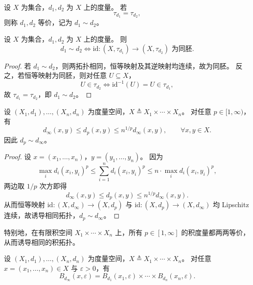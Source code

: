 \documentclass[lang=cn,a4paper,newtx,section]{elegantbook}
\begin{document}
\begin{definition}
  设 $X$ 为集合，$d_1,d_2$ 为 $X$ 上的度量。
  若
  \[
    \tau_{d_1}=\tau_{d_2},
  \]
  则称 $d_1,d_2$ 等价，记为 $d_1\sim d_2$。
\end{definition}

\begin{proposition}\label{prop:equivalent-metrics-homeomorphism}
  设 $X$ 为集合，$d_1,d_2$ 为 $X$ 上的度量。
  则
  \[
    d_1\sim d_2
    \iff
    \mathrm{id}:(X,\tau_{d_1})\to (X,\tau_{d_2})\text{ 为同胚}.
  \]
\end{proposition}

\begin{proof}
  若 $d_1\sim d_2$，则两拓扑相同，恒等映射及其逆映射均连续，故为同胚。
  反之，若恒等映射为同胚，则对任意 $U\subseteq X$，
  \[
    U\in\tau_{d_2}\iff \mathrm{id}^{-1}(U)=U\in\tau_{d_1},
  \]
  故 $\tau_{d_1}=\tau_{d_2}$，即 $d_1\sim d_2$。
\end{proof}

\begin{proposition}\label{prop:dp-dinfty-equivalent}
  设 $(X_1,d_1),\dots,(X_n,d_n)$ 为度量空间，$X\triangleq X_1\times\cdots\times X_n$。
  对任意 $p\in[1,\infty)$，有
  \[
    d_\infty(x,y)\le d_p(x,y)\le n^{1/p}d_\infty(x,y),\qquad \forall x,y\in X.
  \]
  因此 $d_p\sim d_\infty$。
\end{proposition}

\begin{proof}
  设 $x=(x_1,\dots,x_n)$，$y=(y_1,\dots,y_n)$。
  因为
  \[
    \max_i d_i(x_i,y_i)^p\le \sum_{i=1}^{n}d_i(x_i,y_i)^p\le n\cdot\max_i d_i(x_i,y_i)^p,
  \]
  两边取 $1/p$ 次方即得
  \[
    d_\infty(x,y)\le d_p(x,y)\le n^{1/p}d_\infty(x,y).
  \]
  从而恒等映射 $\mathrm{id}:(X,d_\infty)\to(X,d_p)$ 与 $\mathrm{id}:(X,d_p)\to(X,d_\infty)$ 均 Lipschitz 连续，故诱导相同拓扑，$d_p\sim d_\infty$。
\end{proof}

\begin{remark}
  特别地，在有限积空间 $X_1\times\cdots\times X_n$ 上，所有 $p\in[1,\infty]$ 的积度量都两两等价，从而诱导相同的积拓扑。
\end{remark}

\begin{proposition}\label{prop:dinfty-ball-product}
  设 $(X_1,d_1),\dots,(X_n,d_n)$ 为度量空间，$X\triangleq X_1\times\cdots\times X_n$。
  对任意 $x=(x_1,\dots,x_n)\in X$ 与 $\varepsilon>0$，有
  \[
    B_{d_\infty}(x,\varepsilon)=B_{d_1}(x_1,\varepsilon)\times\cdots\times B_{d_n}(x_n,\varepsilon).
  \]
\end{proposition}
\end{document}
